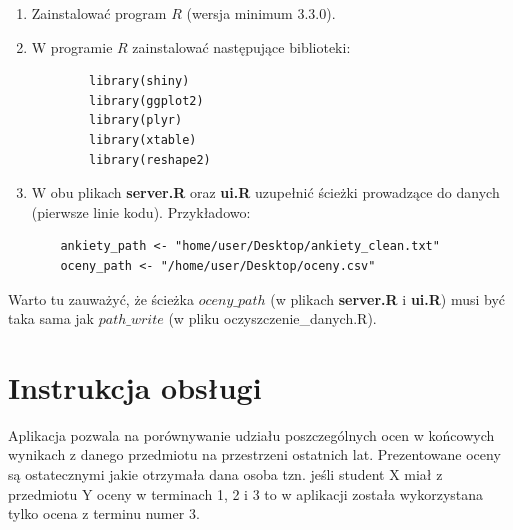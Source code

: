 \documentclass[]{article}
\begin{document}

\begin{enumerate}
	\item Zainstalować program $R$ (wersja minimum 3.3.0).
	\item W programie $R$ zainstalować następujące biblioteki:
	\begin{verbatim}
		library(shiny)
		library(ggplot2)
		library(plyr)
		library(xtable)
		library(reshape2)
	\end{verbatim}
	
	\item W obu plikach \textbf{server.R} oraz \textbf{ui.R} uzupełnić ścieżki prowadzące do danych (pierwsze linie kodu). Przykładowo:
	
	\begin{verbatim}
	ankiety_path <- "home/user/Desktop/ankiety_clean.txt"
	oceny_path <- "/home/user/Desktop/oceny.csv"
	\end{verbatim}
	
\end{enumerate}
Warto tu zauważyć, że ścieżka $oceny\_path$ (w plikach \textbf{server.R} i \textbf{ui.R}) musi być taka sama jak $path\_write$ (w pliku oczyszczenie\_danych.R).

\section{Instrukcja obsługi}


Aplikacja pozwala na porównywanie udziału poszczególnych ocen w końcowych wynikach z danego przedmiotu na przestrzeni ostatnich lat. Prezentowane oceny są ostatecznymi jakie otrzymała dana osoba tzn. jeśli student X miał z przedmiotu Y oceny w terminach 1, 2 i 3 to w aplikacji została wykorzystana tylko ocena z terminu numer 3.
\end{document}
